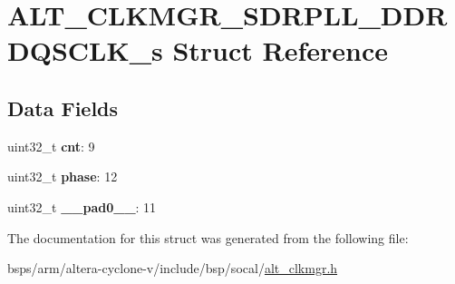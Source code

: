 \hypertarget{structALT__CLKMGR__SDRPLL__DDRDQSCLK__s}{}\section{A\+L\+T\+\_\+\+C\+L\+K\+M\+G\+R\+\_\+\+S\+D\+R\+P\+L\+L\+\_\+\+D\+D\+R\+D\+Q\+S\+C\+L\+K\+\_\+s Struct Reference}
\label{structALT__CLKMGR__SDRPLL__DDRDQSCLK__s}
\subsection*{Data Fields}
\begin{DoxyCompactItemize}
\item 
\mbox{\label{structALT__CLKMGR__SDRPLL__DDRDQSCLK__s_a34c9d5bc5983109c7cbb96dbbb5bae79}} 
uint32\+\_\+t {\bfseries cnt}\+: 9
\item 
\mbox{\label{structALT__CLKMGR__SDRPLL__DDRDQSCLK__s_a7f3122f5c725ef8db0f52485acc278c5}} 
uint32\+\_\+t {\bfseries phase}\+: 12
\item 
\mbox{\label{structALT__CLKMGR__SDRPLL__DDRDQSCLK__s_ab77f9ba70e778df1e1305e52c4ac23fd}} 
uint32\+\_\+t {\bfseries \+\_\+\+\_\+pad0\+\_\+\+\_\+}\+: 11
\end{DoxyCompactItemize}


The documentation for this struct was generated from the following file\+:\begin{DoxyCompactItemize}
\item 
bsps/arm/altera-\/cyclone-\/v/include/bsp/socal/\mbox{\hyperlink{alt__clkmgr_8h}{alt\+\_\+clkmgr.\+h}}\end{DoxyCompactItemize}
